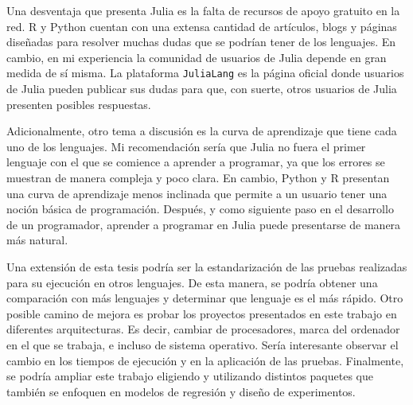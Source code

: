 Una desventaja que presenta \textsf{Julia} es la falta de recursos de apoyo gratuito en la red. \textsf{R} y \textsf{Python} cuentan con una extensa cantidad de artículos, blogs y páginas diseñadas para resolver muchas dudas que se podrían tener de los lenguajes. En cambio, en mi experiencia la comunidad de usuarios de \textsf{Julia} depende en gran medida de sí misma. La plataforma \texttt{JuliaLang} es la página oficial donde usuarios de \textsf{Julia} pueden publicar sus dudas para que, con suerte, otros usuarios de \textsf{Julia} presenten posibles respuestas. 

Adicionalmente, otro tema a discusión es la curva de aprendizaje que tiene cada uno de los lenguajes. Mi recomendación sería que \textsf{Julia} no fuera el primer lenguaje con el que se comience a aprender a programar, ya que los errores se muestran de manera compleja y poco clara. En cambio, \textsf{Python} y \textsf{R} presentan una curva de aprendizaje menos inclinada que permite a un usuario tener una noción básica de programación. Después, y como siguiente paso en el desarrollo de un programador, aprender a programar en \textsf{Julia} puede presentarse de manera más natural.  

Una extensión de esta tesis podría ser la estandarización de las pruebas realizadas para su ejecución en otros lenguajes. De esta manera, se podría obtener una comparación con más lenguajes y determinar que lenguaje es el más rápido. Otro posible camino de mejora es probar los proyectos presentados en este trabajo en diferentes arquitecturas. Es decir, cambiar de procesadores, marca del ordenador en el que se trabaja, e incluso de sistema operativo. Sería interesante observar el cambio en los tiempos de ejecución y en la aplicación de las pruebas. Finalmente, se podría ampliar este trabajo eligiendo y utilizando distintos paquetes que también se enfoquen en modelos de regresión y diseño de experimentos. 





